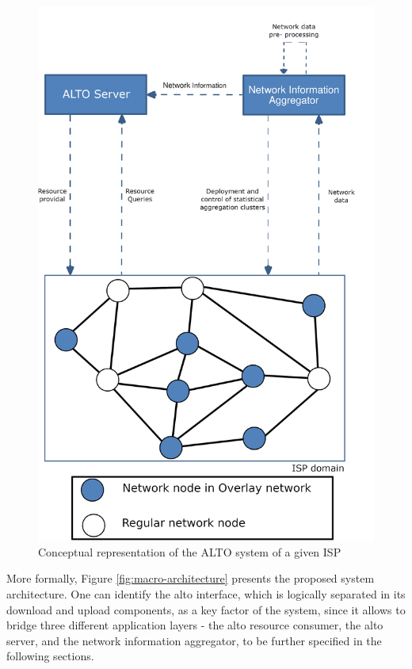 \begin{figure}[H]
        \centering
        \hspace*{0.35cm}
        \includegraphics[scale=0.75]{img/architecture-network.png}
        \caption{Conceptual representation of the ALTO system of a given ISP}
        \label{fig:architecture-network}
\end{figure}

    More formally, Figure \ref{fig:macro-architecture} presents the proposed system architecture.
    One can identify the \gls{alto} interface, which is logically separated in its download and upload components, as a key factor of the system, since it allows to bridge three different application layers - the \gls{alto} resource consumer, the \gls{alto} server, and the network information aggregator, to be further specified in the following sections.

